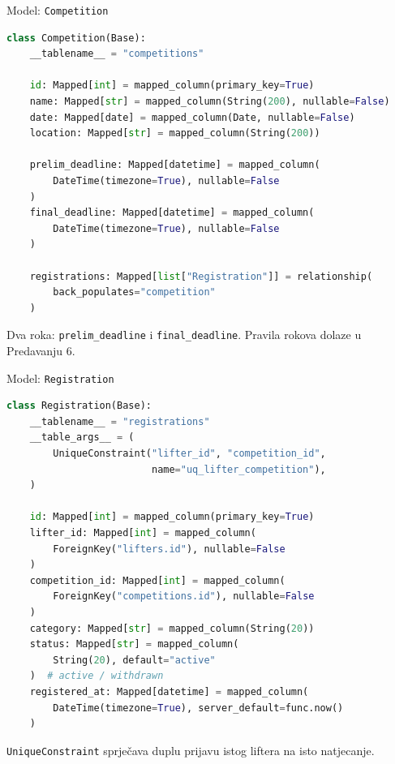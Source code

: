 \begin{frame}[fragile, shrink=5]{Model: \texttt{Competition}}
\begin{lstlisting}[language=python]
class Competition(Base):
    __tablename__ = "competitions"

    id: Mapped[int] = mapped_column(primary_key=True)
    name: Mapped[str] = mapped_column(String(200), nullable=False)
    date: Mapped[date] = mapped_column(Date, nullable=False)
    location: Mapped[str] = mapped_column(String(200))

    prelim_deadline: Mapped[datetime] = mapped_column(
        DateTime(timezone=True), nullable=False
    )
    final_deadline: Mapped[datetime] = mapped_column(
        DateTime(timezone=True), nullable=False
    )

    registrations: Mapped[list["Registration"]] = relationship(
        back_populates="competition"
    )
\end{lstlisting}

\vspace{0.4em}
Dva roka: \texttt{prelim\_deadline} i \texttt{final\_deadline}. Pravila rokova dolaze u Predavanju 6.
\end{frame}

\begin{frame}[fragile,shrink=5]{Model: \texttt{Registration}}
\begin{lstlisting}[language=python]
class Registration(Base):
    __tablename__ = "registrations"
    __table_args__ = (
        UniqueConstraint("lifter_id", "competition_id",
                         name="uq_lifter_competition"),
    )

    id: Mapped[int] = mapped_column(primary_key=True)
    lifter_id: Mapped[int] = mapped_column(
        ForeignKey("lifters.id"), nullable=False
    )
    competition_id: Mapped[int] = mapped_column(
        ForeignKey("competitions.id"), nullable=False
    )
    category: Mapped[str] = mapped_column(String(20))
    status: Mapped[str] = mapped_column(
        String(20), default="active"
    )  # active / withdrawn
    registered_at: Mapped[datetime] = mapped_column(
        DateTime(timezone=True), server_default=func.now()
    )
\end{lstlisting}

\vspace{0.4em}
\texttt{UniqueConstraint} sprječava duplu prijavu istog liftera na isto natjecanje.
\end{frame}

